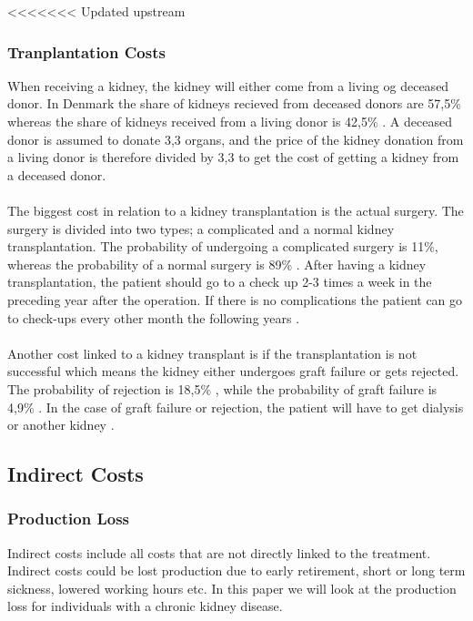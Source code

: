 \documentclass[a4paper,12pt]{article}
\begin{document}
<<<<<<< Updated upstream
\subsubsection*{Tranplantation Costs}

When receiving a kidney, the kidney will either come from a living og deceased donor. In Denmark the share of kidneys recieved from deceased donors are 57,5\% whereas the share of kidneys received from a living donor is  42,5\% \cite{DNSL}. A deceased donor is assumed to donate 3,3 organs, and the price of the kidney donation from a living donor  is therefore divided by 3,3 to get the cost of getting a kidney from a deceased donor. 
\\\\
The biggest cost in relation to a kidney  transplantation is the actual surgery. The surgery is divided into two types; a complicated and a normal kidney transplantation. The probability of undergoing a complicated surgery is 11\%, whereas the probability of a normal surgery is 89\% \cite{esundhed} \cite{CUAdkartikel}. After having a kidney transplantation, the patient should go to a check up 2-3 times a week in the preceding year after the operation. If there is no complications the patient can go to check-ups every other month the following years \cite{Rigshospitalet}. 
\\\\
Another cost linked to a kidney transplant is if the transplantation is not successful which means the kidney either undergoes graft failure or gets rejected. The probability of rejection is 18,5\% \cite{Rigshospitalet}, while the probability of graft failure is 4,9\% \cite{DNSL}. In the case of graft failure or rejection, the patient will have to get dialysis or another kidney \cite{Rigshospitalet}.

\subsection{Indirect Costs}

\subsubsection*{Production Loss}
Indirect costs include all costs that are not directly linked to the treatment. Indirect costs could be lost production due to early retirement, short or long term sickness, lowered working hours etc. In this paper we will look at the production loss for individuals with a chronic kidney disease. 
\end{document}
